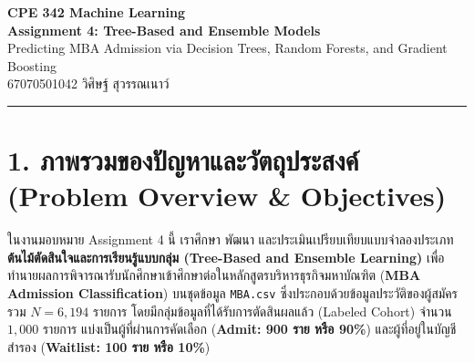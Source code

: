 \documentclass[12pt,a4paper]{article}
\begin{document}
\begin{center}
    {\Large\textbf{CPE 342 Machine Learning}}\\[2pt]
    {\Large\textbf{Assignment 4: Tree-Based and Ensemble Models}}\\[4pt]
    {\large Predicting MBA Admission via Decision Trees, Random Forests, and Gradient Boosting}\\[6pt]
    \textcolor{accentblue}{67070501042 วิศิษฐ์ สุวรรณเนาว์}
\end{center}

\noindent\rule{\textwidth}{0.4pt}\vspace{4pt}

\section*{1. ภาพรวมของปัญหาและวัตถุประสงค์\\ \large(Problem Overview \& Objectives)}

ในงานมอบหมาย Assignment 4 นี้ เราศึกษา พัฒนา และประเมินเปรียบเทียบแบบจำลองประเภท \textbf{ต้นไม้ตัดสินใจและการเรียนรู้แบบกลุ่ม (Tree-Based and Ensemble Learning)} เพื่อทำนายผลการพิจารณารับนักศึกษาเข้าศึกษาต่อในหลักสูตรบริหารธุรกิจมหาบัณฑิต (\textbf{MBA Admission Classification}) บนชุดข้อมูล \texttt{MBA.csv} ซึ่งประกอบด้วยข้อมูลประวัติของผู้สมัครรวม $N = 6,194$ รายการ โดยมีกลุ่มข้อมูลที่ได้รับการตัดสินผลแล้ว (Labeled Cohort) จำนวน $1,000$ รายการ แบ่งเป็นผู้ที่ผ่านการคัดเลือก (\textbf{Admit: 900 ราย หรือ 90\%}) และผู้ที่อยู่ในบัญชีสำรอง (\textbf{Waitlist: 100 ราย หรือ 10\%})
\end{document}
